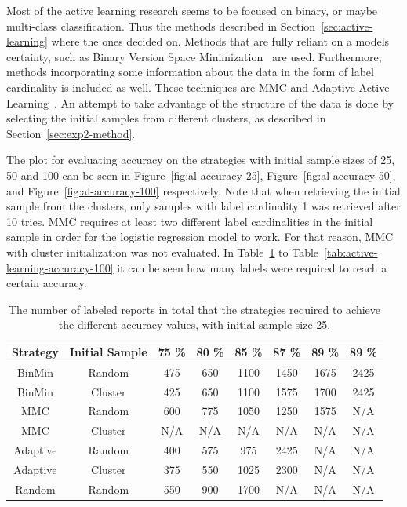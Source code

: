 Most of the active learning research seems to be focused on binary, or maybe multi-class classification.
Thus the methods described in Section~\ref{sec:active-learning} where the ones decided on.
Methods that are fully reliant on a models certainty, such as Binary Version Space Minimization~\cite{brinker2006active} are used.
Furthermore, methods incorporating some information about the data in the form of label cardinality is included as well.
These techniques are MMC and Adaptive Active Learning~\cite{yang2009effective, li2013active}.
An attempt to take advantage of the structure of the data is done by selecting the initial samples from different clusters, as described in Section~\ref{sec:exp2-method}.

The plot for evaluating accuracy on the strategies with initial sample sizes of 25, 50 and 100 can be seen in Figure~\ref{fig:al-accuracy-25}, Figure~\ref{fig:al-accuracy-50}, and Figure~\ref{fig:al-accuracy-100} respectively.
Note that when retrieving the initial sample from the clusters, only samples with label cardinality 1 was retrieved after 10 tries.
MMC requires at least two different label cardinalities in the initial sample in order for the logistic regression model to work.
For that reason, MMC with cluster initialization was not evaluated.
In Table~\ref{tab:active-learning-accuracy-25} to Table~\ref{tab:active-learning-accuracy-100} it can be seen how many labels were required to reach a certain accuracy.


\begin{table}
    \centering
    \begin{tabular}{|cccccccc|}
        \hline
        \textbf{Strategy} & \textbf{Initial Sample} & \textbf{75 \%} & \textbf{80 \%} & \textbf{85 \%} & \textbf{87 \%} & \textbf{89 \%} & \textbf{89 \%}\\
        \hline
        BinMin & Random & 475 & 650 & 1100 & 1450 & 1675 & 2425\\
        BinMin & Cluster & 425 & 650 & 1100 & 1575 & 1700 & 2425\\
        MMC & Random & 600 & 775 & 1050 & 1250 & 1575 & N/A\\
        MMC & Cluster & N/A & N/A & N/A & N/A & N/A & N/A\\
        Adaptive & Random & 400 & 575 & 975 & 2425 & N/A & N/A\\
        Adaptive & Cluster & 375 & 550 & 1025 & 2300 & N/A & N/A\\
        Random & Random & 550 & 900 & 1700 & N/A & N/A & N/A\\
        \hline
    \end{tabular}
    \caption{The number of labeled reports in total that the strategies required to achieve the different accuracy values, with initial sample size 25.}
    \label{tab:active-learning-accuracy-25}
\end{table}

